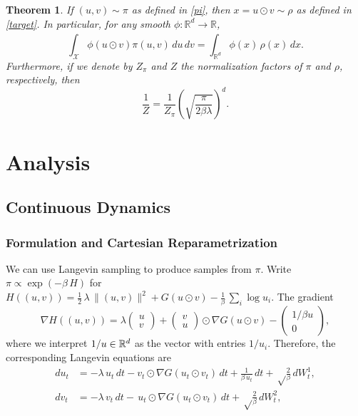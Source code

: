 \documentclass[11pt, twoside]{report}
\newtheorem{theorem}{Theorem}[section]
\begin{document}
\begin{theorem}\label{thm:overparam}If $(u,v)\sim \pi$ as defined in \ref{pi}, then $x=u \odot v\sim\rho$ as defined in \ref{target}. In particular, for any smooth $\phi:\mathbb{R}^d \xrightarrow[]{} \mathbb{R}$,
    \[\int_{\mathcal X} \phi(u \odot v) \pi(u,v)\,du\,dv = \int_{\mathbb{R}^
    d} \phi(x) \,\rho(x)\,dx.\]
    Furthermore, if we denote by $Z_\pi$ and $Z$ the normalization factors of $\pi$ and $\rho$, respectively, then
    \[\frac{1}{Z} = \frac{1}{Z_\pi} \left(\sqrt{\frac{\pi}{2\beta \lambda}}\right)^d.\]
\end{theorem}

\chapter{Analysis}
\section{Continuous Dynamics}
\subsection{Formulation and Cartesian Reparametrization}
We can use Langevin sampling to produce samples from $\pi$. Write $\pi\propto\exp(-\beta\, H)$ for $H((u,v))=\frac 12 \,\lambda\, \|(u,v)\|^2 + G(u\odot v)- \frac{1}{\beta}\,\sum_i\log u_i$. The gradient
\[
\nabla H((u,v))=\lambda\begin{pmatrix}
    u\\v
\end{pmatrix}
+\begin{pmatrix}
    v\\ u
\end{pmatrix}\odot \nabla G(u\odot v)
-\begin{pmatrix}
    1/\beta u\\ 0
\end{pmatrix},
\]
where we interpret $1/u\in\mathbb{R}^d$ as the vector with entries $1/u_i$. Therefore, the corresponding Langevin equations are 
\begin{equation} \label{uvproc}
\begin{split}
du_t&=-\lambda\,   u_t\,dt - v_t\odot \nabla G(u_t\odot v_t)\,dt
 +\frac{1}{\beta \,u_t}\,dt+ \sqrt\frac{2}{\beta}\,dW^1_t,\\
dv_t&=-\lambda\,  v_t\,dt -  \,u_t \odot \nabla G(u_t\odot v_t)\,dt+  \sqrt\frac{2}{\beta}\,dW^2_t,
\label{uvproc}
\end{split}
\end{equation}
\end{document}
